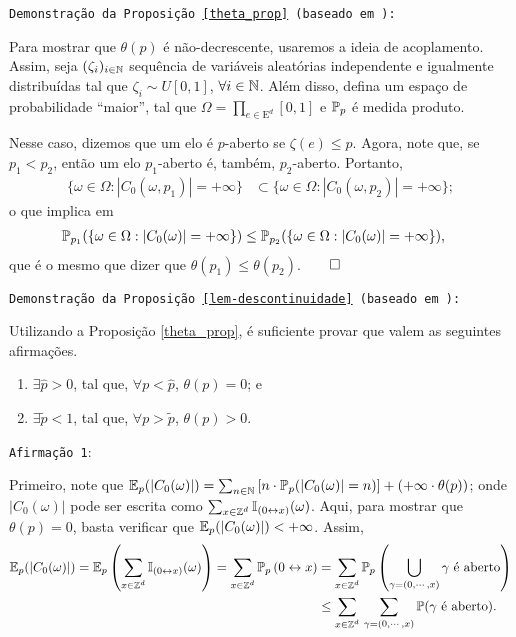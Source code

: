 \par \texttt{Demonstração da Proposição \ref{theta_prop} (baseado em \cite{lectures2010Bernardo}):}

\par Para mostrar que $\theta(p)$ é não-decrescente, usaremos a ideia de acoplamento. Assim, seja $(\zeta_i)_{i \in \operatorname{\mathbb{N}}}$ sequência de variáveis aleatórias independente e igualmente distribuídas tal que $\zeta_i \sim U[0, 1]$, $\forall i \in \operatorname{\mathbb{N}}$. Além disso, defina um espaço de probabilidade ``maior'', tal que $\Omega = \prod_{e \in \text{E}^d} [0, 1]$ e $\operatorname{\mathbb{P}}_p$ é medida produto.

\par Nesse caso, dizemos que um elo é $p$-aberto se $\zeta(e) \leq p$. Agora, note que, se $p_1 < p_2$, então um elo $p_1$-aberto é, também, $p_2$-aberto. Portanto, 
\begin{align*}
\{\omega \in \Omega: |C_0(\omega, p_1)| = +\infty\} &\subset \{\omega \in \Omega: |C_0(\omega, p_2)| = +\infty\};
\end{align*}
o que implica em
\begin{align*}
\operatorname{\mathbb{P}}_{p_1}(\{\omega \in \Omega: |C_0(\omega)| = +\infty\}) &\leq \operatorname{\mathbb{P}}_{p_2}(\{\omega \in \Omega: |C_0(\omega)| = +\infty\}),
\end{align*}
que é o mesmo que dizer que $\theta(p_1) \leq \theta(p_2)$.\hspace{\fill}$\qed$
\vspace{12pt}

\par \texttt{Demonstração da Proposição \ref{lem-descontinuidade} (baseado em \cite{lectures2010Bernardo}): }

\par Utilizando a Proposição \ref{theta_prop}, é suficiente provar que valem as seguintes afirmações.
\begin{enumerate}
	\item $\exists \hat{p} > 0$, tal que, $\forall p < \hat{p}$, $\theta(p) = 0$; e
	\item $\exists \tilde{p} < 1$, tal que, $\forall p > \tilde{p}$, $\theta(p) > 0$.
\end{enumerate}

\par \texttt{Afirmação 1}:

\par Primeiro, note que $\operatorname{\mathbb{E}}_p(|C_0(\omega)|) = \sum_{n \in \operatorname{\mathbb{N}}} \left[n \cdot \operatorname{\mathbb{P}}_p(|C_0(\omega)| = n)\right] + (+\infty \cdot \theta(p))$; onde $|C_0(\omega)|$ pode ser escrita como $\sum_{x \in \operatorname{\mathbb{Z}}^d}\operatorname{\mathbb{I}}_{(0 \leftrightarrow x)}(\omega)$. Aqui, para mostrar que $\theta(p) = 0$, basta verificar que $\operatorname{\mathbb{E}}_p(|C_0(\omega)|) < +\infty$. Assim,
\begin{align*}
	\operatorname{\mathbb{E}}_p(|C_0(\omega)|) = \operatorname{\mathbb{E}}_p\left(\sum_{x \in \operatorname{\mathbb{Z}}^d}\operatorname{\mathbb{I}}_{(0 \leftrightarrow x)}(\omega)\right) = \sum_{x \in \operatorname{\mathbb{Z}}^d}\operatorname{\mathbb{P}}_p\left(0 \leftrightarrow x\right) &= \sum_{x \in \operatorname{\mathbb{Z}}^d}\operatorname{\mathbb{P}}_p\left(\bigcup_{\gamma = (0, \cdots, x)} \gamma \text{ é aberto}\right) \\
	&\leq \sum_{x \in \operatorname{\mathbb{Z}}^d}\,\sum_{\gamma = (0, \cdots, x)}\operatorname{\mathbb{P}}(\gamma \text{ é aberto}).
\end{align*}

